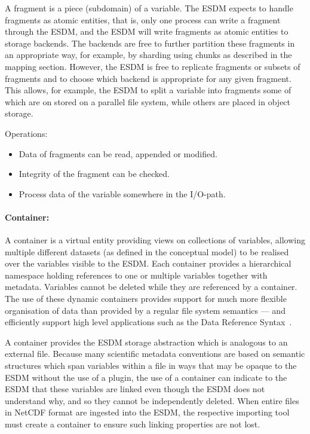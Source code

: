A fragment is a piece (subdomain) of a variable.
The ESDM expects to handle fragments as atomic entities, that is, only one process can write a fragment through the ESDM, and the ESDM will write fragments as atomic entities to storage backends.
The backends are free to further partition these fragments in an appropriate way, for example, by sharding using chunks as described in the mapping section.
However, the ESDM is free to replicate fragments or subsets of fragments and to choose which backend is appropriate for any given fragment.
This allows, for example, the ESDM to split a variable into fragments some of which are on stored on a parallel file system, while others are placed in object storage.
 
Operations:

\begin{itemize}
  \item Data of fragments can be read, appended or modified.
  \item Integrity of the fragment can be checked.
  \item Process data of the variable somewhere in the I/O-path.
\end{itemize}

\paragraph{Container:}%
\label{container}

A container is a virtual entity providing views on collections of variables, allowing multiple different datasets (as defined in the conceptual model) to be realised over the variables visible to the ESDM.
Each container provides a hierarchical namespace holding references to one or multiple variables together with metadata.
Variables cannot be deleted while they are referenced by a container.
The use of these dynamic containers provides support for much more flexible organisation of data than provided by a regular file system semantics --- and efficiently support high level applications such as the Data Reference Syntax~\cite{drs2012}.
 
A container provides the ESDM storage abstraction which is analogous to an external file.
Because many scientific metadata conventions are based on semantic structures which span variables within a file in ways that may be opaque to the ESDM without the use of a plugin, the use of a container can indicate to the ESDM that these variables are linked even though the ESDM does not understand why, and so they cannot be independently deleted.
When entire files in NetCDF format are ingested into the ESDM, the respective importing tool must create a container to ensure such linking properties are not lost.
 
